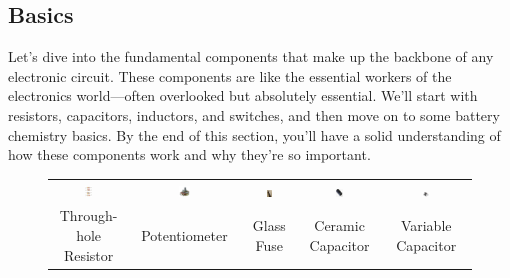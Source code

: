 \subsection{Basics}
\label{subsec:basics-passive}

Let's dive into the fundamental components that make up the backbone of any electronic circuit. These components are like the essential workers of the electronics world—often overlooked but absolutely essential. We'll start with resistors, capacitors, inductors, and switches, and then move on to some battery chemistry basics. By the end of this section, you'll have a solid understanding of how these components work and why they're so important.



\begin{figure}[h!]
    \centering
    \footnotesize
    \begin{tabular}{ccccc}
        \includegraphics[width=0.11\textwidth]{images/resistor} &
        \includegraphics[width=0.11\textwidth]{images/potentiometer} &
        \includegraphics[width=0.11\textwidth]{images/fuse} &
        \includegraphics[width=0.11\textwidth]{images/capacitor} &
        \includegraphics[width=0.11\textwidth]{images/variable-capacitor} \\
        Through-hole Resistor & Potentiometer & Glass Fuse & Ceramic Capacitor & Variable Capacitor \\[2em]

\end{tabular}
\end{figure}
